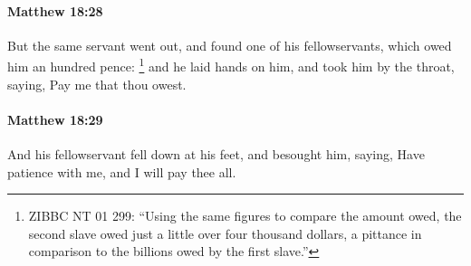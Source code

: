 		\paragraph{Matthew 18:28} %
			\label{MATTHEW-18-28}

			But the same servant went out, and found one of his fellowservants, which owed him an hundred pence:%
				\footnote{%
					ZIBBC NT 01 299: ``Using the same figures to compare the amount owed, the second slave owed just a little over four thousand dollars, a pittance in comparison to the billions owed by the first slave.''
					}
			and he laid hands on him, and took him by the throat, saying, Pay me that thou owest.

			\begin{framed}
			\scriptsize
				\begin{compactdesc}
					\item[SBLG] 
				\end{compactdesc}
			\end{framed}

		\paragraph{Matthew 18:29} %
			\label{MATTHEW-18-29}

			And his fellowservant fell down at his feet, and besought him, saying, Have patience with me, and I will pay thee all.

